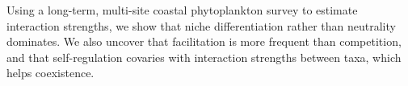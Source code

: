 \documentclass[english]{article}
\begin{document}
Using a long-term, multi-site coastal phytoplankton survey to estimate interaction strengths, we show that niche differentiation rather than neutrality dominates. We also uncover that facilitation is more frequent than competition, and that self-regulation covaries with interaction strengths between taxa, which helps coexistence.
\end{document}
